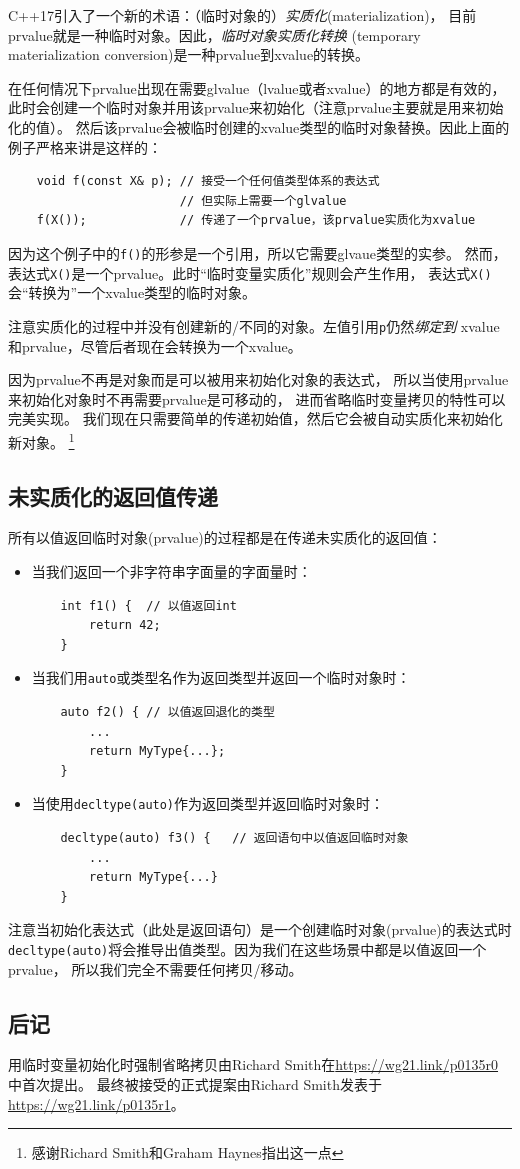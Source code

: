 C++17引入了一个新的术语：（临时对象的）\emph{实质化}(materialization)，
目前prvalue就是一种临时对象。因此，\emph{临时对象实质化转换}
(temporary materialization conversion)是一种prvalue到xvalue的转换。

在任何情况下prvalue出现在需要glvalue（lvalue或者xvalue）的地方都是有效的，
此时会创建一个临时对象并用该prvalue来初始化（注意prvalue主要就是用来初始化的值）。
然后该prvalue会被临时创建的xvalue类型的临时对象替换。因此上面的例子严格来讲是这样的：
\begin{lstlisting}
    void f(const X& p); // 接受一个任何值类型体系的表达式
                        // 但实际上需要一个glvalue
    f(X());             // 传递了一个prvalue，该prvalue实质化为xvalue
\end{lstlisting}
因为这个例子中的\texttt{f()}的形参是一个引用，所以它需要glvaue类型的实参。
然而，表达式\texttt{X()}是一个prvalue。此时“临时变量实质化”规则会产生作用，
表达式\texttt{X()}会“转换为”一个xvalue类型的临时对象。

注意实质化的过程中并没有创建新的/不同的对象。左值引用\texttt{p}仍然\emph{绑定到}
xvalue和prvalue，尽管后者现在会转换为一个xvalue。

因为prvalue不再是对象而是可以被用来初始化对象的表达式，
所以当使用prvalue来初始化对象时不再需要prvalue是可移动的，
进而省略临时变量拷贝的特性可以完美实现。
我们现在只需要简单的传递初始值，然后它会被自动实质化来初始化新对象。
\footnote{感谢Richard Smith和Graham Haynes指出这一点}

\subsection{未实质化的返回值传递}
所有以值返回临时对象(prvalue)的过程都是在传递未实质化的返回值：
\begin{itemize}[leftmargin=*]
    \item 当我们返回一个非字符串字面量的字面量时：
    \begin{lstlisting}
    int f1() {  // 以值返回int
        return 42;
    }
    \end{lstlisting}
    \item 当我们用\texttt{auto}或类型名作为返回类型并返回一个临时对象时：
    \begin{lstlisting}
    auto f2() { // 以值返回退化的类型
        ...
        return MyType{...};
    }
    \end{lstlisting}
    \item 当使用\texttt{decltype(auto)}作为返回类型并返回临时对象时：
    \begin{lstlisting}
    decltype(auto) f3() {   // 返回语句中以值返回临时对象
        ...
        return MyType{...}
    }
    \end{lstlisting}
\end{itemize}

注意当初始化表达式（此处是返回语句）是一个创建临时对象(prvalue)的表达式时
\texttt{decltype(auto)}将会推导出值类型。因为我们在这些场景中都是以值返回一个prvalue，
所以我们完全不需要任何拷贝/移动。

\subsection{后记}
用临时变量初始化时强制省略拷贝由Richard Smith在\url{https://wg21.link/p0135r0}中首次提出。
最终被接受的正式提案由Richard Smith发表于\url{https://wg21.link/p0135r1}。

\setcounter{footnote}{0}